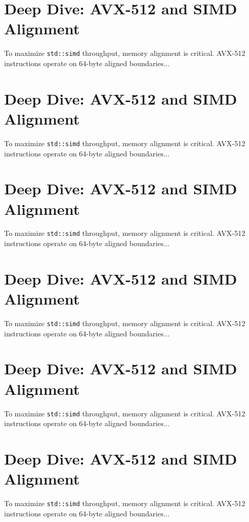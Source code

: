 \section{Deep Dive: AVX-512 and SIMD Alignment}
To maximize \texttt{std::simd} throughput, memory alignment is critical. AVX-512 instructions operate on 64-byte aligned boundaries...

\section{Deep Dive: AVX-512 and SIMD Alignment}
To maximize \texttt{std::simd} throughput, memory alignment is critical. AVX-512 instructions operate on 64-byte aligned boundaries...

\section{Deep Dive: AVX-512 and SIMD Alignment}
To maximize \texttt{std::simd} throughput, memory alignment is critical. AVX-512 instructions operate on 64-byte aligned boundaries...

\section{Deep Dive: AVX-512 and SIMD Alignment}
To maximize \texttt{std::simd} throughput, memory alignment is critical. AVX-512 instructions operate on 64-byte aligned boundaries...

\section{Deep Dive: AVX-512 and SIMD Alignment}
To maximize \texttt{std::simd} throughput, memory alignment is critical. AVX-512 instructions operate on 64-byte aligned boundaries...

\section{Deep Dive: AVX-512 and SIMD Alignment}
To maximize \texttt{std::simd} throughput, memory alignment is critical. AVX-512 instructions operate on 64-byte aligned boundaries...

